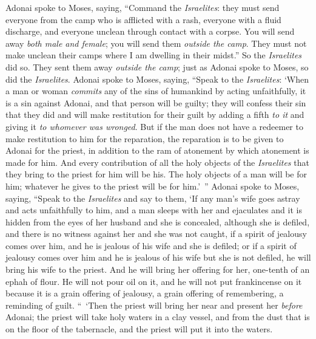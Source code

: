 \begin{biblechapter} %
 Adonai spoke to Moses, saying,
\verse “Command the \textit{Israelites}: they must send everyone from the camp who is afflicted with a rash, everyone with a fluid discharge, and everyone unclean through contact with a corpse.
\verse You will send away \textit{both male and female}; you will send them \textit{outside the camp}. They must not make unclean their camps where I am dwelling in their midst.”
\verse So the \textit{Israelites} did so. They sent them away \textit{outside the camp}; just as Adonai spoke to Moses, so did the \textit{Israelites}.
 Adonai spoke to Moses, saying,
\verse “Speak to the \textit{Israelites}: ‘When a man or woman \textit{commits} any of the sins of humankind by acting unfaithfully, it is a sin against Adonai, and that person will be guilty;
\verse they will confess their sin that they did and will make restitution for their guilt by adding a fifth \textit{to it} and giving it \textit{to whomever was wronged}.
\verse But if the man does not have a redeemer to make restitution to him for the reparation, the reparation is to be given to Adonai for the priest, in addition to the ram of atonement by which atonement is made for him.
\verse And every contribution of all the holy objects of the \textit{Israelites} that they bring to the priest for him will be his.
\verse The holy objects of a man will be for him; whatever he gives to the priest will be for him.’ ”
 Adonai spoke to Moses, saying,
\verse “Speak to the \textit{Israelites} and say to them, ‘If any man’s wife goes astray and acts unfaithfully to him,
\verse and a man sleeps with her and ejaculates and it is hidden from the eyes of her husband and she is concealed, although she is defiled, and there is no witness against her and she was not caught,
\verse if a spirit of jealousy comes over him, and he is jealous of his wife and she is defiled; or if a spirit of jealousy comes over him and he is jealous of his wife but she is not defiled,
\verse he will bring his wife to the priest. And he will bring her offering for her, one-tenth of an ephah of flour. He will not pour oil on it, and he will not put frankincense on it because it is a grain offering of jealousy, a grain offering of remembering, a reminding of guilt.
\verse “ ‘Then the priest will bring her near and present her \textit{before} Adonai;
\verse the priest will take holy waters in a clay vessel, and from the dust that is on the floor of the tabernacle, and the priest will put it into the waters.

\end{biblechapter}
